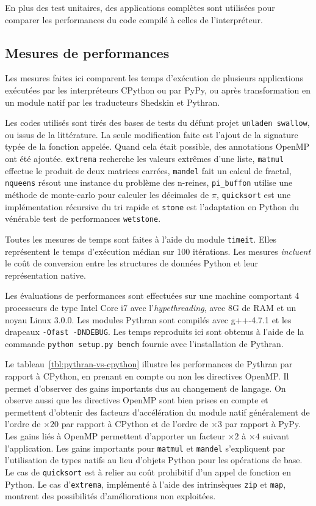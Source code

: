 \documentclass[renpar]{compas2013}
\begin{document}
En plus des test unitaires, des applications complètes sont utilisées pour
comparer les performances du code compilé à celles de l'interpréteur.

\subsection{Mesures de performances}

Les mesures faites ici comparent les temps d'exécution de plusieurs
applications exécutées par les interpréteurs CPython ou par PyPy, ou après
transformation en un module natif par les traducteurs Shedskin et Pythran.

Les codes utilisés sont tirés des bases de tests du défunt projet
\texttt{unladen swallow}, ou issus de la littérature. La seule
modification faite est l'ajout de la signature typée de la fonction
appelée. Quand cela était possible, des annotations OpenMP ont été
ajoutée. \texttt{extrema} recherche les valeurs extrêmes d'une liste,
\texttt{matmul} effectue le produit de deux matrices
carrées, \texttt{mandel} fait un calcul de fractal, \texttt{nqueens}
résout une instance du problème des n-reines, \texttt{pi\_buffon} utilise
une méthode de monte-carlo pour calculer les décimales de $\pi$,
\texttt{quicksort} est une implémentation récursive du tri rapide et
\texttt{stone} est l'adaptation en Python du vénérable test de
performances \texttt{wetstone}.

Toutes les mesures de temps sont faites à l'aide du module
\texttt{timeit}. Elles représentent le temps d'exécution médian sur 100
itérations. Les mesures \emph{incluent} le coût de conversion entre les
structures de données Python et leur représentation native.

Les évaluations de performances sont effectuées sur une machine comportant
4 processeurs de type Intel Core i7 avec l'\emph{hypethreading}, avec 8G
de RAM et un noyau Linux 3.0.0.
Les modules Pythran sont compilés avec g++-4.7.1 et les drapeaux
\texttt{-Ofast -DNDEBUG}.
Les temps reproduits ici sont obtenus à l'aide de la commande
\texttt{python setup.py bench} fournie avec l'installation de Pythran.

Le tableau~\ref{tbl:pythran-vs-cpython} illustre les performances de
Pythran par rapport à CPython, en prenant en compte ou non les directives
OpenMP. Il permet d'observer des gains importants dus au changement de
langage. On observe aussi que les directives OpenMP sont bien prises en
compte et permettent d'obtenir des facteurs d'accélération du module natif
généralement de l'ordre de $\times20$ par rapport à CPython et de l'ordre
de $\times3$ par rapport à PyPy. Les gains liés à OpenMP permettent
d'apporter un facteur $\times2$ à $\times4$ suivant l'application. Les
gains importants pour \texttt{matmul} et \texttt{mandel} s'expliquent par
l'utilisation de types natifs au lieu d'objets Python pour les opérations
de base. Le cas de \texttt{quicksort} est à relier au coût prohibitif d'un
appel de fonction en Python. Le cas d'\texttt{extrema}, implémenté à
l'aide des intrinsèques \texttt{zip} et \texttt{map}, montrent des
possibilités d'améliorations non exploitées.
\end{document}
